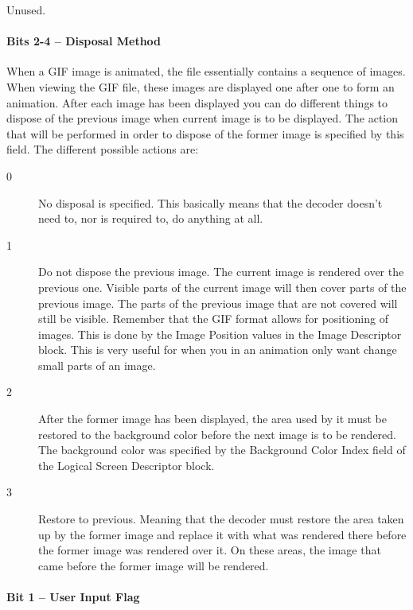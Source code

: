 Unused.

\paragraph{Bits 2-4 -- Disposal Method}

When a GIF image is animated, the file essentially contains a sequence
of images. When viewing the GIF file, these images are displayed one
after one to form an animation. After each image has been displayed
you can do different things to dispose of the previous image when
current image is to be displayed. The action that will be performed in
order to dispose of the former image is specified by this field. The
different possible actions are:

\begin{description}

\item[0] No disposal is specified. This basically means that the
  decoder doesn't need to, nor is required to, do anything at all.

\item[1] Do not dispose the previous image. The current image is
  rendered over the previous one. Visible parts of the current image
  will then cover parts of the previous image. The parts of the
  previous image that are not covered will still be visible. Remember
  that the GIF format allows for positioning of images. This is done
  by the Image Position values in the Image Descriptor block. This is
  very useful for when you in an animation only want change small
  parts of an image.

\item[2] After the former image has been displayed, the area used by
  it must be restored to the background color before the next image is
  to be rendered. The background color was specified by the Background
  Color Index field of the Logical Screen Descriptor block.

\item[3] Restore to previous. Meaning that the decoder must restore
  the area taken up by the former image and replace it with what was
  rendered there before the former image was rendered over it. On
  these areas, the image that came before the former image will be
  rendered.


\end{description}

\paragraph{Bit 1  -- User Input Flag}

